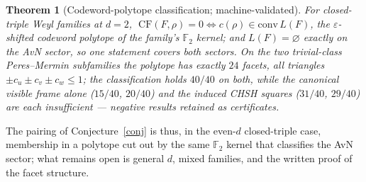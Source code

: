 \documentclass[11pt]{article}
\newtheorem{theorem2}[theorem]{Theorem}
\theoremstyle{remark}
\theoremstyle{plain}
\begin{document}
\begin{theorem2}[Codeword-polytope classification; machine-validated]\label{thm:pair}
For closed-triple Weyl families at $d=2$,
$\;\mathrm{CF}(F,\rho)=0 \iff c(\rho)\in\mathrm{conv}\,L(F)$, the
$\varepsilon$-shifted codeword polytope of the family's $\mathbb{F}_2$ kernel; and
$L(F)=\varnothing$ exactly on the AvN sector, so one statement covers both sectors.
On the two trivial-class Peres--Mermin subfamilies the polytope has exactly $24$ facets,
all triangles $\pm c_u\pm c_v\pm c_w\le 1$; the classification holds $40/40$ on both,
while the canonical visible frame alone ($15/40$, $20/40$) and the induced CHSH squares
($31/40$, $29/40$) are each insufficient --- negative results retained as certificates.
\end{theorem2}

The pairing of Conjecture~\ref{conj} is thus, in the even-$d$ closed-triple case,
membership in a polytope cut out by the same $\mathbb{F}_2$ kernel that classifies the
AvN sector; what remains open is general $d$, mixed families, and the written proof of
the facet structure.
\end{document}
